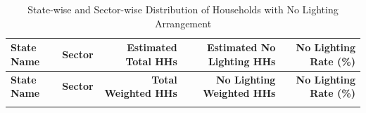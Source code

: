 \documentclass{article}
\begin{document}
	
	\begin{center}
		\small
		\begin{longtable}{l l r r r}
			\caption{State-wise and Sector-wise Distribution of Households with No Lighting Arrangement} \\
			\toprule
			\textbf{State Name} & \textbf{Sector} & \textbf{Estimated Total HHs} & \textbf{Estimated No Lighting  HHs} & \textbf{No Lighting Rate (\%)} \\
			\midrule
			\endfirsthead
			
			\toprule
			\textbf{State Name} & \textbf{Sector} & \textbf{Total Weighted HHs} & \textbf{No Lighting Weighted HHs} & \textbf{No Lighting Rate (\%)} \\
			\midrule
			\endhead
			
			\bottomrule
			\endfoot
			

\end{longtable}
\end{center}
\end{document}
